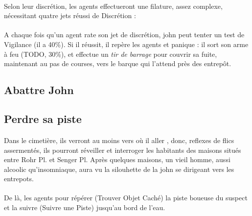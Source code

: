 \paragraph{} Selon leur discrétion, les agents effectueront une filature, assez complexe, nécessitant quatre jets réussi de Discrétion :
\begin{itemize}
\end{itemize}



\paragraph{} A chaque fois qu'un agent rate son jet de discrétion, \gls{john} peut tenter un test de Vigilance (il a 40\%). Si il réussit, il 
repère les agents et panique : il sort son arme à feu (TODO, 30\%), et effectue un \emph{tir de barrage} pour couvrir sa fuite, maintenant au 
pas de courses, vers le barque qui l'attend près des entrepôt.

\subsection{Abattre John}


\subsection{Perdre sa piste}

\paragraph{} Dans le cimetière, ils verront au moins vers où il aller , donc, reflexes de flics assermentés, ils pourront réveiller et interroger les 
habitants des maisons situés entre Rohr Pl. et Senger Pl. Après quelques maisons, un vieil homme, aussi alcoolic qu'insomniaque, aura vu la
silouhette de la \gls{john} se dirigeant vers les entrepots.

\paragraph{} De là, les agents pour répérer (Trouver Objet Caché) la piste boueuse du suspect et la suivre (Suivre une Piste) jusqu'au bord de 
l'eau.

